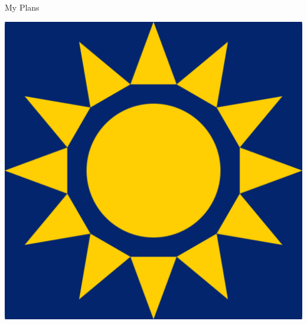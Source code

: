 \documentclass{beamer}
\begin{document}
\begin{frame}{My Plans}
\begin{center}
        \includegraphics[height=0.2\textheight]{static/pycon-namibia.png}

    \end{center}
\end{frame}
\end{document}
